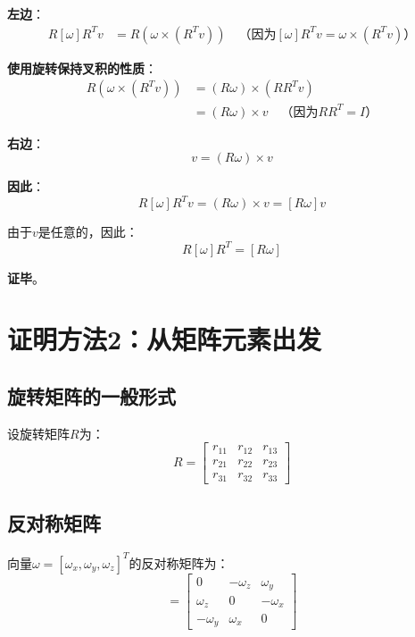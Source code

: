 \documentclass[12pt,a4paper]{article}
\begin{document}
\textbf{左边}：
\begin{align}
R [\omega] R^T v &= R (\omega \times (R^T v)) \quad \text{（因为$[\omega] R^T v = \omega \times (R^T v)$）}
\end{align}

\textbf{使用旋转保持叉积的性质}：
\begin{align}
R (\omega \times (R^T v)) &= (R \omega) \times (R R^T v) \\
&= (R \omega) \times v \quad \text{（因为$R R^T = I$）}
\end{align}

\textbf{右边}：
\begin{equation}
[R \omega] v = (R \omega) \times v
\end{equation}

\textbf{因此}：
\begin{equation}
R [\omega] R^T v = (R \omega) \times v = [R \omega] v
\end{equation}

由于$v$是任意的，因此：
\begin{equation}
R [\omega] R^T = [R \omega]
\end{equation}

\textbf{证毕}。

\section{证明方法2：从矩阵元素出发}

\subsection{旋转矩阵的一般形式}

设旋转矩阵$R$为：
\begin{equation}
R = \begin{bmatrix}
r_{11} & r_{12} & r_{13} \\
r_{21} & r_{22} & r_{23} \\
r_{31} & r_{32} & r_{33}
\end{bmatrix}
\end{equation}

\subsection{反对称矩阵}

向量$\omega = [\omega_x, \omega_y, \omega_z]^T$的反对称矩阵为：
\begin{equation}
[\omega] = \begin{bmatrix}
0 & -\omega_z & \omega_y \\
\omega_z & 0 & -\omega_x \\
-\omega_y & \omega_x & 0
\end{bmatrix}
\end{equation}
\end{document}
